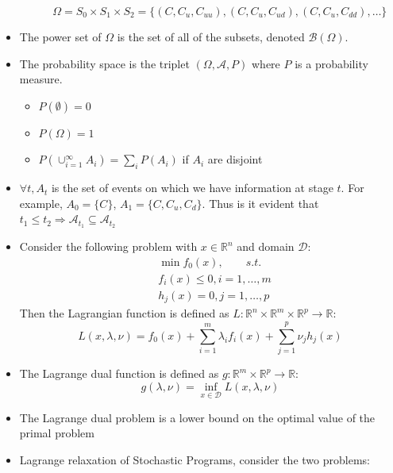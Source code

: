 \documentclass[12pt, openany]{report}
\newcommand{\R}{\mathbb{R}}
\newcommand{\A}{\mathcal{A}}
\theoremstyle{definition}
\begin{document}
\begin{itemize}
\begin{itemize}
		\begin{equation}
			\Omega = S_0 \times S_1 \times S_2 = \{(C, C_u, C_{uu}), (C, C_u, C_{ud}), (C, C_u, C_{dd}), \dots\}
		\end{equation}
	\end{itemize}
	\item The power set of $\Omega$ is the set of all of the subsets, denoted $\mathcal{B}(\Omega)$.
	\item The probability space is the triplet $(\Omega, \A, P)$ where $P$ is a probability measure.
	\begin{itemize}
		\item $P(\emptyset) = 0$
		\item $P(\Omega) = 1$
		\item $P(\cup_{i=1}^\infty A_i) = \sum_i P(A_i)$ if $A_i$ are disjoint
	\end{itemize} 
	\item $\forall t, A_t$ is the set of events on which we have information at stage $t$. For example, $A_0 = \{C\}$, $A_1 = \{C, C_u, C_d\}$. Thus is it evident that $ t_1 \leq t_2 \Rightarrow \A_{t_1} \subseteq \A_{t_2}$
	\item Consider the following problem with $x \in \R^n$ and domain $\mathcal{D}$:
	\begin{equation}
		\begin{aligned}
			&\min f_0(x), \qquad s.t.\\
			&f_i(x) \leq 0, i = 1, \dots, m\\
			&h_j(x) = 0, j = 1, \dots, p
		\end{aligned}
	\end{equation}
	Then the Lagrangian function is defined as $L: \R^n \times \R^m \times \R^p \to \R$:
	\begin{equation}
		L(x, \lambda, \nu) = f_0(x) + \sum_{i=1}^m \lambda_i f_i(x) + \sum_{j=1}^p \nu_j h_j(x)
	\end{equation}
	\item  The Lagrange dual function is defined as $g: \R^m \times \R^p \to \R$:
	\begin{equation}
		g(\lambda, \nu) = \inf_{x \in \mathcal{D}} L(x, \lambda, \nu)
	\end{equation}
	\item The Lagrange dual problem is a lower bound on the optimal value of the primal problem
	\item Lagrange relaxation of Stochastic Programs, consider the two problems:
	\begin{equation}
		\begin{aligned}

\end{aligned}
\end{equation}
\end{itemize}
\end{document}
